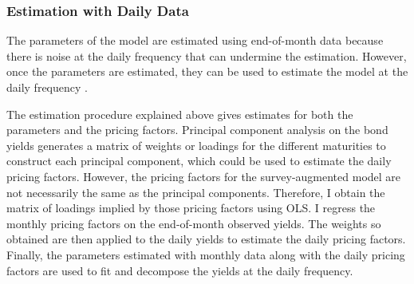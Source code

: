 {\subsubsection{Estimation with Daily Data}
\iftoggle{toclinks}{\gototoc}{} %
The parameters of the model are estimated using end-of-month data because there is noise at the daily frequency that can undermine the estimation. 
However, once the parameters are estimated, they can be used to estimate the model at the daily frequency \citep{ACM:2013}.

The estimation procedure explained above gives estimates for both the parameters and the pricing factors.
Principal component analysis on the bond yields generates a matrix of weights or loadings for the different maturities to construct each principal component, which could be used to estimate the daily pricing factors.
However, the pricing factors for the survey-augmented model are not necessarily the same as the principal components.
Therefore, I obtain the matrix of loadings implied by those pricing factors using OLS.
I regress the monthly pricing factors on the end-of-month observed yields.
The weights so obtained are then applied to the daily yields to estimate the daily pricing factors.
Finally, the parameters estimated with monthly data along with the daily pricing factors are used to fit and decompose the yields at the daily frequency.

%


}
